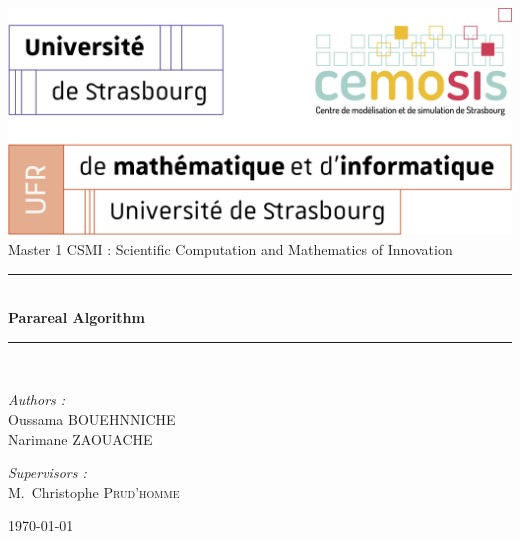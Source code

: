 \documentclass[a4paper,12pt,french]{article}
\begin{document}

\begin{titlepage}
\begin{center}

\includegraphics[width=1\textwidth]{logo.png}\\[1cm]

{\large Master 1 CSMI : Scientific Computation and Mathematics of Innovation}\\[0.5cm]

\rule{\linewidth}{0.5mm} \\[0.4cm]
{ \huge \bfseries Parareal Algorithm \\[0.4cm] }
\rule{\linewidth}{0.5mm} \\[1.5cm]

\noindent
\begin{minipage}{0.6\textwidth}
  \begin{flushleft} \large
    \emph{Authors :}\\
    Oussama \textsc{BOUEHNNICHE}\\
    Narimane \textsc{ZAOUACHE}
  \end{flushleft}
\end{minipage}%
\begin{minipage}{0.4\textwidth}
  \begin{flushright} \large
    \emph{Supervisors :} \\
    M.~Christophe \textsc{Prud'homme}
  \end{flushright}
\end{minipage}

\vfill

{\today}

\end{center}
\end{titlepage}
\end{document}

